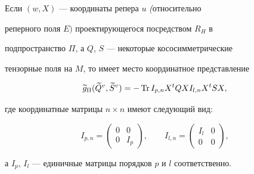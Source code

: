 \begin{lems} Если $(w,X)$ --- координаты репера $u$ {\em (}относительно


реперного поля $E)$ проектирующегося посредством $R_H$ в


подпространство $\Pi $, а $Q$, $S$ --- некоторые кососимметрические


тензорные поля на $M$, то имеет место координатное представление


\begin{equation}


\g g_\Pi (\grv Q,\grv S)=-\Tr I_{p,n}X^tQXI_{l,n}X^tSX,


\end{equation}


где координатные матрицы $n\times n$ имеют следующий вид:


$$


I_{p,n}=


\begin{pmatrix}


0 & 0 \\


0 & I_p


\end{pmatrix}


,\qquad


I_{l,n}=


\begin{pmatrix}


I_l & 0\\


0 & 0


\end{pmatrix}


,


$$


а $I_p$, $I_l$ --- единичные матрицы порядков $p$ и $l$ соответственно.


\end{lems}





